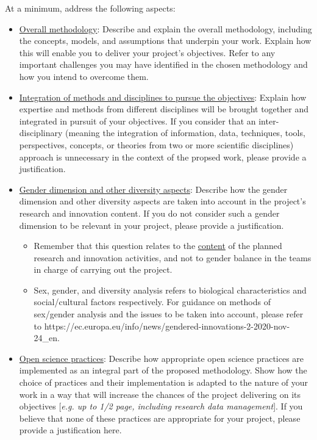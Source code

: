 \documentclass[11pt,a4paper]{article}
\begin{document}
\color{gray}
At a minimum, address the following aspects:
\begin{itemize}
    \item \underline{Overall methodology}: Describe and explain the overall methodology, including the concepts, models, and assumptions that underpin your work. Explain how this will enable you to deliver your project's objectives. Refer to any important challenges you may have identified in the chosen methodology and how you intend to overcome them.
    \item \underline{Integration of methods and disciplines to pursue the objectives}: Explain how expertise and methods from different disciplines will be brought together and integrated in pursuit of your objectives. If you consider that an inter-disciplinary (meaning the integration of information, data, techniques, tools, perspectives, concepts, or theories from two or more scientific disciplines) approach is unnecessary in the context of the propsed work, please provide a justification.
    \item \underline{Gender dimension and other diversity aspects}: Describe how the gender dimension and other diversity aspects are taken into account in the project's research and innovation content. If you do not consider such a gender dimension to be relevant in your project, please provide a justification.
    \begin{itemize}
        \item Remember that this question relates to the \underline{content} of the planned research and innovation activities, and not to gender balance in the teams in charge of carrying out the project.
        \item Sex, gender, and diversity analysis refers to biological characteristics and social/cultural factors respectively. For guidance on methods of sex/gender analysis and the issues to be taken into account, please refer to https://ec.europa.eu/info/news/gendered-innovations-2-2020-nov-24\_en.
    \end{itemize}
    \item \underline{Open science practices}: Describe how appropriate open science practices are implemented as an integral part of the proposed methodology. Show how the choice of practices and their implementation is adapted to the nature of your work in a way that will increase the chances of the project delivering on its objectives [\textit{e.g. up to 1/2 page, including research data management}]. If you believe that none of these practices are appropriate for your project, please provide a justification here.\\

\end{itemize}
\end{document}
